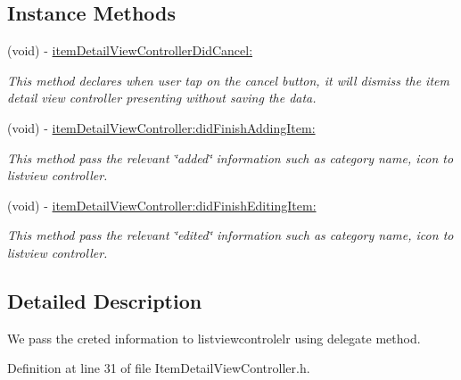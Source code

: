 \subsection*{Instance Methods}
\begin{DoxyCompactItemize}
\item 
(void) -\/ \hyperlink{protocol_item_detail_view_controller_delegate-p_aff7149953ffd00cf72ca89940f27cc7b}{item\-Detail\-View\-Controller\-Did\-Cancel\-:}
\begin{DoxyCompactList}\small\item\em This method declares when user tap on the cancel button, it will dismiss the item detail view controller presenting without saving the data. \end{DoxyCompactList}\item 
(void) -\/ \hyperlink{protocol_item_detail_view_controller_delegate-p_a93a61edd4ec13014f719f8d521d6cfa1}{item\-Detail\-View\-Controller\-:did\-Finish\-Adding\-Item\-:}
\begin{DoxyCompactList}\small\item\em This method pass the relevant \char`\"{}added\char`\"{} information such as category name, icon to listview controller. \end{DoxyCompactList}\item 
(void) -\/ \hyperlink{protocol_item_detail_view_controller_delegate-p_ab8158fefde9bdac1d4ad585a8a9b592a}{item\-Detail\-View\-Controller\-:did\-Finish\-Editing\-Item\-:}
\begin{DoxyCompactList}\small\item\em This method pass the relevant \char`\"{}edited\char`\"{} information such as category name, icon to listview controller. \end{DoxyCompactList}\end{DoxyCompactItemize}


\subsection{Detailed Description}
We pass the creted information to listviewcontrolelr using delegate method. 

Definition at line 31 of file Item\-Detail\-View\-Controller.\-h.



